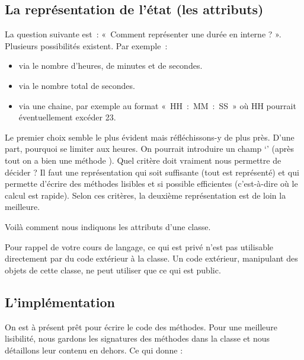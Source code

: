 	\subsection{La représentation de l'état (les attributs)}
	
		La question suivante est~: «~Comment représenter une durée en interne ?
		». Plusieurs possibilités existent. Par exemple~:	
		\begin{itemize}
			\item 
				via le nombre d’heures, de minutes et de secondes.
			\item 
				via le nombre total de secondes.
			\item 
				via une chaine, par exemple au format «~HH~:~MM~:~SS~» où HH pourrait
				éventuellement excéder 23.
		\end{itemize}
		
		Le premier choix semble le plus évident mais réfléchissons-y de plus
		près. D’une part, pourquoi se limiter aux heures. On pourrait
		introduire un champ ‘’ (après tout on a bien
		une méthode ). 		
		Quel critère doit vraiment nous permettre de décider ? Il faut une
		représentation qui soit suffisante (tout est représenté) et qui
		permette d’écrire des méthodes lisibles et si possible efficientes
		(c'est-à-dire où le calcul est rapide). Selon ces
		critères, la deuxième représentation est de loin la meilleure. 
		
		Voilà comment nous indiquons les attributs d'une classe.
		
		\begin{algo}
		\end{algo}
	
		Pour rappel de votre cours de langage,
		ce qui est privé n'est pas utilisable directement 
		par du code extérieur à la classe.
		Un code extérieur, manipulant des objets de cette classe,
		ne peut utiliser que ce qui est public.
		
	\subsection{L'implémentation}
	
		On est à présent prêt pour écrire le code des méthodes. 
		Pour une meilleure lisibilité,
		nous gardons les signatures des méthodes dans la classe
		et nous détaillons leur contenu en dehors.
		Ce qui donne :
		
